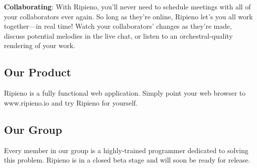 \documentclass[12pt]{article}
\begin{document}
{\bf Collaborating}: With Ripieno, you'll never need to schedule meetings with all of your collaborators ever again. So long as they're online, Ripieno let's you all work together---in real time! Watch your collaborators' changes as they're made, discuss potential melodies in the live chat, or listen to an orchestral-quality rendering of your work.

\subsection{Our Product}
Ripieno is a fully functional web application. Simply point your web browser to www.ripieno.io and try Ripieno for yourself.

\subsection{Our Group}
Every member in our group is a highly-trained programmer dedicated to solving this problem. Ripieno is in a closed beta stage and will soon be ready for release.
\end{document}
